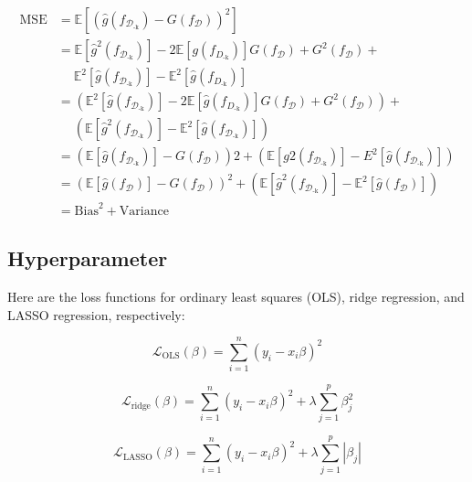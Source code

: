 \begin{equation} \label{eq_tradeoff}
    \begin{split}
        \mathrm{MSE}&=\mathbb{E}[(\hat{g}(f_{\mathcal{D}_{\text{-k}}})-G(f_\mathcal{D}))^2]\\
        &=\mathbb{E}[{\hat{g}}^2(f_{\mathcal{D}_{\text{-k}}})] - 2\mathbb{E}[g(f_{D_\text{-k}})]G(f_\mathcal{D})+G^2(f_\mathcal{D}) +\\
        &\quad \; \mathbb{E}^2[\hat{g}(f_{\mathcal{D}_{\text{-k}}})] - \mathbb{E}^2[\hat{g}(f_{D_\text{-k}})]\\
        &=(\mathbb{E}^2[\hat{g}(f_{\mathcal{D}_{\text{-k}}})] - 2\mathbb{E}[\hat{g}(f_{D_\text{-k}})]G(f_{\mathcal{D}}) + G^{2}(f_{\mathcal{D}})) +\\
        &\quad \; (\mathbb{E}[{\hat{g}}^2(f_{\mathcal{D}_{\text{-k}}})]-\mathbb{E}^2[\hat{g}(f_{\mathcal{D}_{\text{-k}}})])\\
        &=(\mathbb{E}[\hat{g}(f_{\mathcal{D}_{\text{-k}}})]-G(f_{\mathcal{D}}))2+(\mathbb{E}[g2(f_{\mathcal{D}_{\text{-k}}})]-E^2[\hat{g}(f_{\mathcal{D}_{\text{-k}}})])\\
        &=(\mathbb{E}[\hat{g}(f_\mathcal{D})] - G(f_{\mathcal{D}}))^{2} +(\mathbb{E}[\hat{g}^2(f_{\mathcal{D}_{\text{-k}}})]-\mathbb{E}^2[\hat{g}(f_{\mathcal{D}})])\\
        &={\mathrm{Bias}}^2+\mathrm{Variance}
    \end{split}
\end{equation}

\subsection*{Hyperparameter}

Here are the loss functions for ordinary least squares (OLS), ridge regression, and LASSO regression, respectively:


\begin{equation} \label{eq_ols}
    \mathcal{L}_\text{OLS}(\beta)=\sum_{i=1}^{n}(y_i-x_i\beta)^2
\end{equation}

\begin{equation} \label{eq_ridge}
    \mathcal{L}_\text{ridge}(\beta)=\sum_{i=1}^{n}(y_i-x_i\beta)^2+\lambda\sum_{j=1}^{p}\beta_{j}^2
\end{equation}

\begin{equation} \label{eq_lasso}
    \mathcal{L}_\text{LASSO}(\beta)=\sum_{i=1}^{n}(y_i-x_i\beta)^2+\lambda\sum_{j=1}^{p}|\beta_j|
\end{equation}

